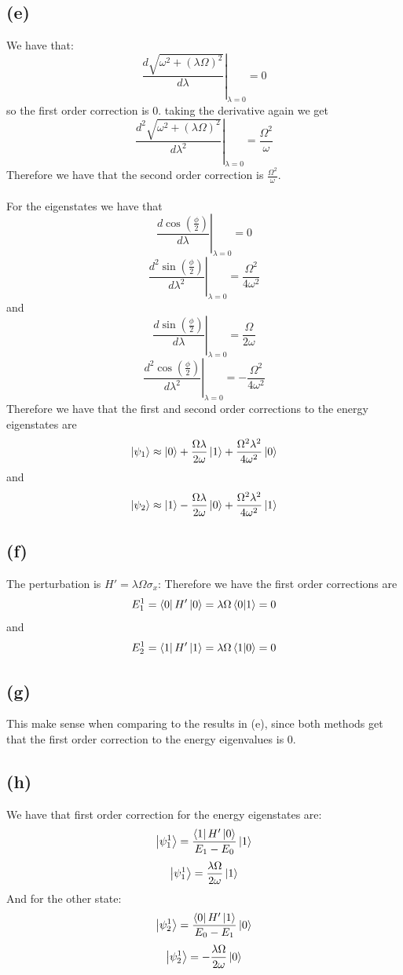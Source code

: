 \documentclass[11pt]{article}
\begin{document}
\subsection*{(e)}
We have that:
$$\left.\frac{d\sqrt{\omega^2+(\lambda\Omega)^2}}{d\lambda}\right|_{\lambda=0}=0$$
so the first order correction is $0$. taking the derivative again we get 
$$\left.\frac{d^2\sqrt{\omega^2+(\lambda\Omega)^2}}{d\lambda^2}\right|_{\lambda=0}=\frac{\Omega^2}{\omega}$$
Therefore we have that the second order correction is $\frac{\Omega^2}{\omega}$.\\\\
For the eigenstates we have that 
$$\left.\frac{d\cos\left(\frac{\phi}{2}\right)}{d\lambda}\right|_{\lambda=0}=0$$
$$\left.\frac{d^2\sin\left(\frac{\phi}{2}\right)}{d\lambda^2}\right|_{\lambda=0}=\frac{\Omega^2}{4\omega^2}$$
and 
$$\left.\frac{d\sin\left(\frac{\phi}{2}\right)}{d\lambda}\right|_{\lambda=0}=\frac{\Omega}{2\omega}$$
$$\left.\frac{d^2\cos\left(\frac{\phi}{2}\right)}{d\lambda^2}\right|_{\lambda=0}=-\frac{\Omega^2}{4\omega^2}$$
Therefore we have that the first and second order corrections to the energy eigenstates are 
$$\ket{\psi_1}\approx \ket{0}+\frac{\Omega\lambda}{2\omega}\ket{1}+\frac{\Omega^2\lambda^2}{4\omega^2}\ket{0}$$
and
$$\ket{\psi_2}\approx \ket{1}-\frac{\Omega\lambda}{2\omega}\ket{0}+\frac{\Omega^2\lambda^2}{4\omega^2}\ket{1}$$
\subsection*{(f)}
The perturbation is $H'=\lambda\Omega\sigma_x$:
Therefore we have the first order corrections are 
$$E_{1}^{1}=\bra{0}H'\ket{0}=\lambda\Omega\bra{0}\ket{1}=0$$
and
$$E_{2}^{1}=\bra{1}H'\ket{1}=\lambda\Omega\bra{1}\ket{0}=0$$
\subsection*{(g)}
This make sense when comparing to the results in (e), since both methods get 
that the first order correction to the energy eigenvalues is $0$.
\subsection*{(h)}
We have that first order correction for the energy eigenstates are:
$$\ket{\psi_1^{1}}=\frac{\bra{1}H'\ket{0}}{E_{1}-E_{0}}\ket{1}$$
$$\ket{\psi_1^{1}}=\frac{\lambda\Omega}{2\omega}\ket{1}$$
And for the other state:
$$\ket{\psi_2^{1}}=\frac{\bra{0}H'\ket{1}}{E_{0}-E_{1}}\ket{0}$$
$$\ket{\psi_2^{1}}=-\frac{\lambda\Omega}{2\omega}\ket{0}$$
\end{document}
